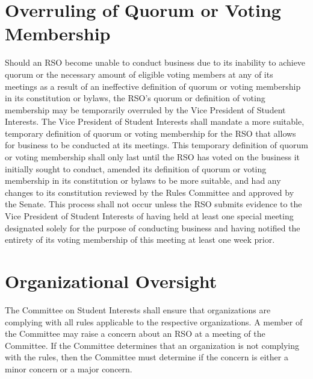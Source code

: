 \documentclass[12pt]{scrreprt}
\begin{document}
\section{Overruling of Quorum or Voting Membership}
Should an RSO become unable to conduct business due to its inability to achieve quorum or the necessary amount of eligible voting members at any of its meetings as a result of an ineffective definition of quorum or voting membership in its constitution or bylaws, the RSO’s quorum or definition of voting membership may be temporarily overruled by the Vice President of Student Interests. The Vice President of Student Interests shall mandate a more suitable, temporary definition of quorum or voting membership for the RSO that allows for business to be conducted at its meetings. This temporary definition of quorum or voting membership shall only last until the RSO has voted on the business it initially sought to conduct, amended its definition of quorum or voting membership in its constitution or bylaws to be more suitable, and had any changes to its constitution reviewed by the Rules Committee and approved by the Senate. This process shall not occur unless the RSO submits evidence to the Vice President of Student Interests of having held at least one special meeting designated solely for the purpose of conducting business and having notified the entirety of its voting membership of this meeting at least one week prior.

\section {Organizational Oversight}
The Committee on Student Interests shall ensure that organizations are complying with all rules applicable to the respective organizations. A member of the Committee may raise a concern about an RSO at a meeting of the Committee. If the Committee determines that an organization is not complying with the rules, then the Committee must determine if the concern is either a minor concern or a major concern.
\end{document}
